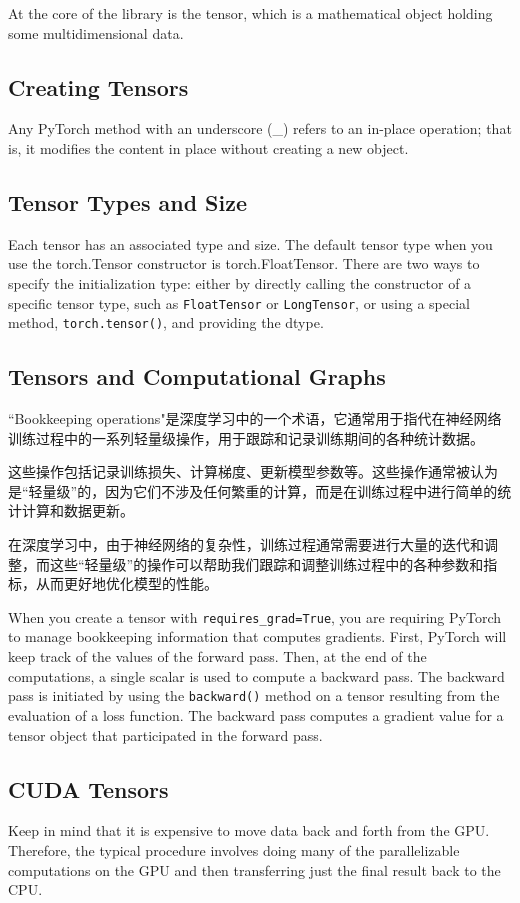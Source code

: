At the core of the library is the tensor, which is a mathematical object holding some multidimensional data.

\subsection{Creating Tensors}
Any PyTorch method with an underscore (\_) refers to an in-place operation; that is, it modifies the content in place without creating a new
object.

\subsection{Tensor Types and Size}
Each tensor has an associated type and size. The default tensor type when you use the
torch.Tensor constructor is torch.FloatTensor. There are two ways to specify the initialization
type: either by directly calling the constructor of a specific tensor type, such as \verb|FloatTensor| or \verb|LongTensor|, or using a special method, \verb|torch.tensor()|, and providing
the dtype.

\subsection{Tensors and Computational Graphs}
``Bookkeeping operations"是深度学习中的一个术语，它通常用于指代在神经网络训练过程中的一系列轻量级操作，用于跟踪和记录训练期间的各种统计数据。

这些操作包括记录训练损失、计算梯度、更新模型参数等。这些操作通常被认为是“轻量级”的，因为它们不涉及任何繁重的计算，而是在训练过程中进行简单的统计计算和数据更新。

在深度学习中，由于神经网络的复杂性，训练过程通常需要进行大量的迭代和调整，而这些“轻量级”的操作可以帮助我们跟踪和调整训练过程中的各种参数和指标，从而更好地优化模型的性能。

When you create a tensor with \verb|requires_grad=True|, you are requiring PyTorch to manage bookkeeping information that computes gradients. First, PyTorch will keep track of the values of the forward pass. Then, at the end of the computations, a single scalar is used to compute a backward pass. The backward pass is initiated by using the \verb|backward()| method on a tensor resulting from the evaluation of a loss function. The backward pass computes a gradient value for a tensor object that participated in the forward pass.

\subsection{CUDA Tensors}
Keep in mind that it is expensive to move data back and forth from the GPU. Therefore, the typical procedure involves doing many of the parallelizable computations on the GPU and then transferring just the final result back to the CPU.